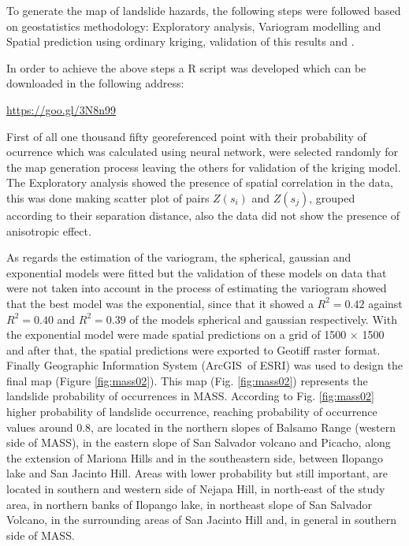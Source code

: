 \documentclass[11pt,twoside]{rmta2010esp}%
\begin{document}
To generate the map of landslide hazards, the following steps were followed based on geostatistics methodology: Exploratory analysis, Variogram modelling and Spatial prediction using ordinary kriging, validation of this results and . 

In order to achieve the above steps a R script was developed which can be downloaded in the following address:

\url{https://goo.gl/3N8n99}

First of all one thousand fifty georeferenced point with their probability of ocurrence which was calculated using neural network, were selected randomly for the map generation process leaving the others for validation of the kriging model. The Exploratory analysis showed the presence of spatial correlation in the data, this was done making scatter plot of pairs $Z(s_{i})$ and  $Z(s_{j})$, grouped according to their separation distance, also the data did not show the presence of anisotropic effect. 

As regards the estimation of the variogram, the spherical, gaussian and exponential models were fitted but the validation of these models on data that were not taken into account in the process of estimating the variogram showed that the best model was the exponential, since that it showed a $ R^{2} = 0.42 $ against $ R^{2} = 0.40 $ and $ R^{2} = 0.39 $ of the models spherical and gaussian respectively. With the exponential model were made spatial predictions on a grid of 1500 $\times$ 1500 and after that, the spatial predictions were exported to Geotiff raster format. Finally Geographic Information System (ArcGIS\textregistered \  of ESRI) was used to design the final map (Figure \ref{fig:mass02}). This map (Fig. \ref{fig:mass02}) represents the landslide probability of occurrences in MASS. According to Fig. \ref{fig:mass02} higher probability of landslide occurrence, reaching probability of occurrence values around 0.8, are located in the northern slopes of Balsamo Range (western side of MASS), in the eastern slope of San Salvador volcano and Picacho,  along the extension of Mariona Hills  and in the southeastern side, between Ilopango lake and San Jacinto Hill. Areas with lower probability but still important, are located in southern and western side of Nejapa Hill, in north-east of the study area, in northern banks of Ilopango lake, in northeast slope of San Salvador Volcano, in the surrounding areas of San Jacinto Hill and, in general in southern side of MASS. 
\end{document}
